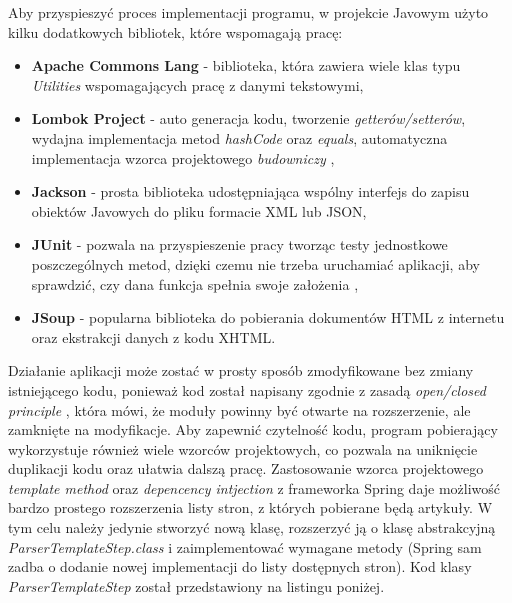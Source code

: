 Aby przyspieszyć proces implementacji programu, w projekcie Javowym użyto kilku dodatkowych bibliotek, które wspomagają pracę:
\begin{itemize}
\setlength\itemsep{0.6em}
\item \textbf{Apache Commons Lang} - biblioteka, która zawiera wiele klas typu \textit{Utilities} wspomagających pracę z danymi tekstowymi,
\item \textbf{Lombok Project} - auto generacja kodu, tworzenie \textit{getterów/setterów}, wydajna implementacja metod \textit{hashCode} oraz \textit{equals}, automatyczna implementacja wzorca projektowego \textit{budowniczy} \cite{designpatterns}, 
\item \textbf{Jackson} - prosta biblioteka udostępniająca wspólny interfejs do zapisu obiektów Javowych do pliku formacie XML lub JSON,
\item \textbf{JUnit} - pozwala na przyspieszenie pracy tworząc testy jednostkowe poszczególnych metod, dzięki czemu nie trzeba uruchamiać aplikacji, aby sprawdzić, czy dana funkcja spełnia swoje założenia \cite{cleanCode},
\item \textbf{JSoup} - popularna biblioteka do pobierania dokumentów HTML z internetu oraz ekstrakcji danych z kodu XHTML.
\end{itemize}

Działanie aplikacji może zostać w prosty sposób zmodyfikowane bez zmiany istniejącego kodu, ponieważ kod został napisany zgodnie z zasadą \textit{open/closed principle} \cite{cleanCode}, która mówi, że moduły powinny być otwarte na rozszerzenie, ale zamknięte na modyfikacje. Aby zapewnić czytelność kodu, program pobierający wykorzystuje również wiele wzorców projektowych, co pozwala na uniknięcie duplikacji kodu oraz ułatwia dalszą pracę. Zastosowanie wzorca projektowego \textit{template method} \cite{designpatterns} oraz \textit{depencency intjection} z frameworka Spring \cite{spring-in-action} daje możliwość bardzo prostego rozszerzenia listy stron, z których pobierane będą artykuły. W tym celu należy jedynie stworzyć nową klasę, rozszerzyć ją o klasę abstrakcyjną \textit{ParserTemplateStep.class} i zaimplementować wymagane metody (Spring sam zadba o dodanie nowej implementacji do listy dostępnych stron). Kod klasy \textit{ParserTemplateStep} został przedstawiony na listingu poniżej.

